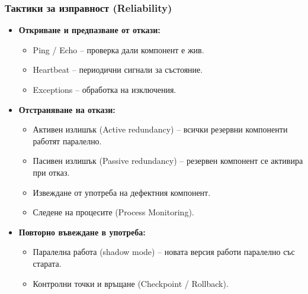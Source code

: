\documentclass{scrartcl}
\begin{document}
\begin{FlushLeft}
\subsubsection{Тактики за изправност (Reliability)}
\begin{itemize}
    \item \textbf{Откриване и предпазване от откази:}
    \begin{itemize}
        \item Ping / Echo – проверка дали компонент е жив.
        \item Heartbeat – периодични сигнали за състояние.
        \item Exceptions – обработка на изключения.
    \end{itemize}
    \item \textbf{Отстраняване на откази:}
    \begin{itemize}
        \item Активен излишък (Active redundancy) – всички резервни компоненти работят паралелно.
        \item Пасивен излишък (Passive redundancy) – резервен компонент се активира при отказ.
        \item Извеждане от употреба на дефектния компонент.
        \item Следене на процесите (Process Monitoring).
    \end{itemize}
    \item \textbf{Повторно въвеждане в употреба:}
    \begin{itemize}
        \item Паралелна работа (shadow mode) – новата версия работи паралелно със старата.
        \item Контролни точки и връщане (Checkpoint / Rollback).
    \end{itemize}
\end{itemize}


\end{FlushLeft}
\end{document}
